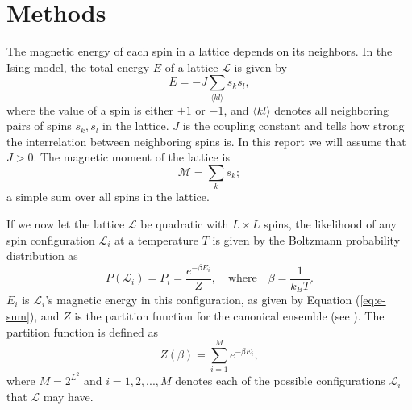 \documentclass[]{article}
\begin{document}


\section{Methods} \label{sec:methods}


The magnetic energy of each spin in a lattice depends on its neighbors. In the Ising model, the total energy $E$ of a lattice $\mathcal{L}$ is given by
\begin{equation} \label{eq:e-sum}
	E = -J \sum_{\langle kl \rangle} s_k s_l,
\end{equation}
where the value of a spin is either $+1$ or $-1$, and $\langle kl \rangle$ denotes all neighboring pairs of spins $s_k, s_l$ in the lattice. $J$ is the coupling constant and tells how strong the interrelation between neighboring spins is. In this report we will assume that $J > 0$. The magnetic moment of the lattice is
\begin{equation} \label{eq:m-sum}
	\mathcal{M} = \sum_{k} s_k;
\end{equation}
a simple sum over all spins in the lattice.


If we now let the lattice $\mathcal{L}$ be quadratic with $L \times L$ spins, the likelihood of any spin configuration $\mathcal{L}_i$ at a temperature $T$ is given by the Boltzmann probability distribution as
\begin{equation} \label{eq:pi}
	P(\mathcal{L}_i) = P_i = \frac{e^{-\beta E_i}}{Z}, \quad \text{where} \quad \beta = \frac{1}{k_BT}.
\end{equation}
$E_i$ is $\mathcal{L}_i$'s magnetic energy in this configuration, as given by Equation (\ref{eq:e-sum}), and $Z$ is the partition function for the canonical ensemble (see \cite{fys4150-notes}). The partition function is defined as
\begin{equation} \label{eq:partition-function}
	Z(\beta) = \sum_{i=1}^{M} e^{-\beta E_i},
\end{equation}
where $M = 2^{L^2}$ and $i = 1,2,...,M$ denotes each of the possible configurations $\mathcal{L}_i$ that $\mathcal{L}$ may have.
\end{document}
